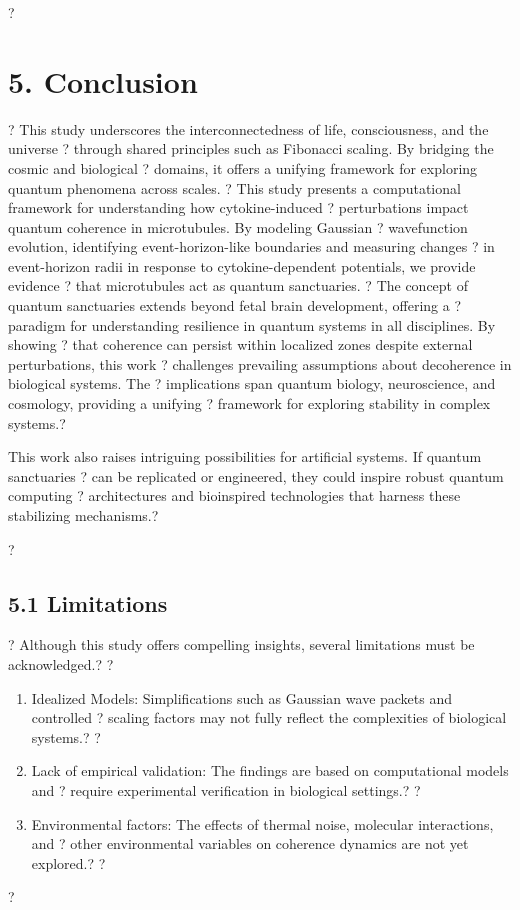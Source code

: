 ?\section{5. Conclusion}?
This study underscores the interconnectedness of life, consciousness, and the universe ?
through shared principles such as Fibonacci scaling. By bridging the cosmic and biological ?
domains, it offers a unifying framework for exploring quantum phenomena across scales. ?
This study presents a computational framework for understanding how cytokine-induced ?
perturbations impact quantum coherence in microtubules. By modeling Gaussian ?
wavefunction evolution, identifying event-horizon-like boundaries and measuring changes ?
in event-horizon radii in response to cytokine-dependent potentials, we provide evidence ?
that microtubules act as quantum sanctuaries. ?
The concept of quantum sanctuaries extends beyond fetal brain development, offering a ?
paradigm for understanding resilience in quantum systems in all disciplines. By showing ?
that coherence can persist within localized zones despite external perturbations, this work ?
challenges prevailing assumptions about decoherence in biological systems. The ?
implications span quantum biology, neuroscience, and cosmology, providing a unifying ?
framework for exploring stability in complex systems.?

This work also raises intriguing possibilities for artificial systems. If quantum sanctuaries ?
can be replicated or engineered, they could inspire robust quantum computing ?
architectures and bioinspired technologies that harness these stabilizing mechanisms.?

?\subsection{5.1 Limitations}?
Although this study offers compelling insights, several limitations must be acknowledged.?
?\begin{enumerate}?
?    \item Idealized Models: Simplifications such as Gaussian wave packets and controlled ?
scaling factors may not fully reflect the complexities of biological systems.?
?    \item Lack of empirical validation: The findings are based on computational models and ?
require experimental verification in biological settings.?
?    \item Environmental factors: The effects of thermal noise, molecular interactions, and ?
other environmental variables on coherence dynamics are not yet explored.?
?\end{enumerate}?

